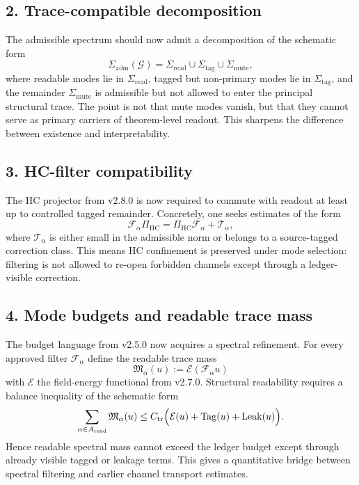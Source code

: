 \subsection*{2. Trace-compatible decomposition}
The admissible spectrum should now admit a decomposition of the schematic form
\[
\Sigma_{\mathrm{adm}}(\mathcal G)
= \Sigma_{\mathrm{read}} \cup \Sigma_{\mathrm{tag}} \cup \Sigma_{\mathrm{mute}},
\]
where readable modes lie in $\Sigma_{\mathrm{read}}$, tagged but non-primary modes lie
in $\Sigma_{\mathrm{tag}}$, and the remainder $\Sigma_{\mathrm{mute}}$ is admissible but
not allowed to enter the principal structural trace. The point is not that mute
modes vanish, but that they cannot serve as primary carriers of theorem-level
readout. This sharpens the difference between existence and interpretability.

\subsection*{3. HC-filter compatibility}
The HC projector from v2.8.0 is now required to commute with readout at least up to
controlled tagged remainder. Concretely, one seeks estimates of the form
\[
\mathcal F_\alpha \Pi_{\mathrm{HC}}
= \Pi_{\mathrm{HC}} \mathcal F_\alpha + \mathcal T_\alpha,
\]
where $\mathcal T_\alpha$ is either small in the admissible norm or belongs to a
source-tagged correction class. This means HC confinement is preserved under mode
selection: filtering is not allowed to re-open forbidden channels except through a
ledger-visible correction.

\subsection*{4. Mode budgets and readable trace mass}
The budget language from v2.5.0 now acquires a spectral refinement. For every
approved filter $\mathcal F_\alpha$ define the readable trace mass
\[
\mathfrak M_\alpha(u) := \mathcal E(\mathcal F_\alpha u)
\]
with $\mathcal E$ the field-energy functional from v2.7.0. Structural readability
requires a balance inequality of the schematic form
\[
\sum_{\alpha\in A_{\mathrm{read}}} \mathfrak M_\alpha(u)
\le C_{\mathrm{tr}}
\Bigl( \mathcal E(u) + \mathrm{Tag}(u) + \mathrm{Leak}(u) \Bigr).
\]
Hence readable spectral mass cannot exceed the ledger budget except through already
visible tagged or leakage terms. This gives a quantitative bridge between spectral
filtering and earlier channel transport estimates.

